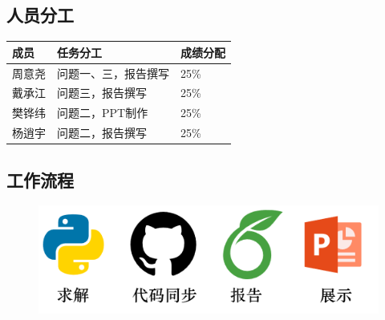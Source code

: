 \documentclass[withoutpreface,bwprint]{thesis-config}
\begin{document}
\begin{appendices}
\section{人员分工}
\begin{table}[H]
\centering
\begin{tabularx}{\textwidth}{LLL}
\toprule
成员   & 任务分工  & 成绩分配 \\
\midrule
周意尧 & 问题一、三，报告撰写 & 25\% \\
戴承江 & 问题三，报告撰写 & 25\%\\
樊铧纬 & 问题二，PPT制作 & 25\%\\
杨逍宇 & 问题二，报告撰写 & 25\% \\


\bottomrule
\end{tabularx}
\end{table}
\end{appendices}

\begin{appendices}
\section{工作流程}
\begin{figure}[htbp]
    \centering
    \includegraphics[width=0.75\linewidth]{figures/workflow.png}
\end{figure}
\end{appendices}
\end{document}
